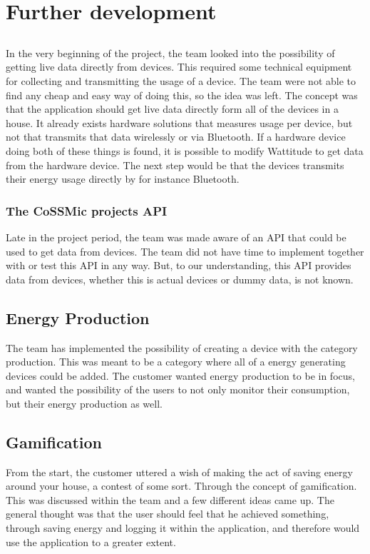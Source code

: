 \chapter{Further development}
\label{sec:further}
\section{}
In the very beginning of the project, the team looked into the possibility of getting live data directly from devices. This required some technical equipment for collecting and transmitting the usage of a device. The team were not able to find any cheap and easy way of doing this, so the idea was left. The concept was that the application should get live data directly form all of the devices in a house. It already exists hardware solutions that measures usage per device, but not that transmits that data wirelessly or via Bluetooth. If a hardware device doing both of these things is found, it is possible to modify Wattitude to get data from the hardware device. The next step would be that the devices transmits their energy usage directly by for instance Bluetooth. 

\subsection{The CoSSMic projects API}
Late in the project period, the team was made aware of an API that could be used to get data from devices. The team did not have time to implement together with or test this API in any way. But, to our understanding, this API provides data from devices, whether this is actual devices or dummy data, is not known. 

\section{Energy Production}
The team has implemented the possibility of creating a device with the category production. This was meant to be a category where all of a  energy generating devices could be added. The customer wanted energy production to be in focus, and wanted the possibility of the users to not only monitor their consumption, but their energy production as well. 

\section{Gamification}
From the start, the customer uttered a wish of making the act of saving energy around your house, a contest of some sort. Through the concept of gamification. This was discussed within the team and a few different ideas came up. The general thought was that the user should feel that he achieved something, through saving energy and logging it within the application, and therefore would use the application to a greater extent. 

